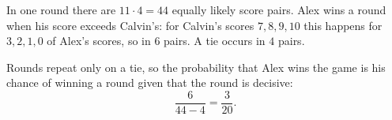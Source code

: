 In one round there are $11\cdot4=44$ equally likely score pairs. Alex wins a round when his score exceeds Calvin's: for Calvin's scores $7,8,9,10$ this happens for $3,2,1,0$ of Alex's scores, so in $6$ pairs. A tie occurs in $4$ pairs.

Rounds repeat only on a tie, so the probability that Alex wins the game is his chance of winning a round given that the round is decisive:
\[\dfrac{6}{44-4}=\boxed{\dfrac3{20}}.\]
